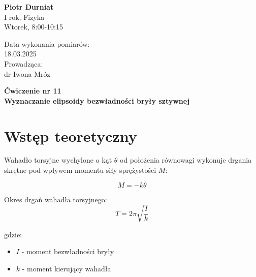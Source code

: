 \documentclass[a4paper,12pt]{article}
\begin{document}
\noindent
\begin{minipage}{0.5\textwidth}
    \raggedright
    \textbf{Piotr Durniat} \\
    I rok, Fizyka \\
    Wtorek, 8:00-10:15 \\
    \vspace{0.5cm}
    \vspace{0.5cm}
\end{minipage}%
\begin{minipage}{0.5\textwidth}
    \raggedleft
    Data wykonania pomiarów: \\
    18.03.2025 \\
    \vspace{0.5cm}
    Prowadząca: \\
    dr Iwona Mróz
\end{minipage}


\vspace{2cm}
\begin{center}
    \LARGE \textbf{Ćwiczenie nr 11} \\[0.5cm]
    \Large \textbf{Wyznaczanie elipsoidy bezwładności bryły sztywnej}
\end{center}

\vspace{1cm}
\noindent

\tableofcontents
\newpage



\section{Wstęp teoretyczny}

Wahadło torsyjne wychylone o kąt $\theta$ od położenia równowagi wykonuje drgania skrętne pod wpływem momentu siły sprężystości $M$:

\begin{equation}
    M = -k\theta
\end{equation}


Okres drgań wahadła torsyjnego:
\begin{equation} \label{eq:okres_drgan_w_zaleznosci_od_momentu_bezwladnosci}
    T = 2\pi \sqrt{\frac{I}{k}}
\end{equation}

gdzie:
\begin{itemize}
    \item $I$ - moment bezwładności bryły
    \item $k$ - moment kierujący wahadła
\end{itemize}
\end{document}
